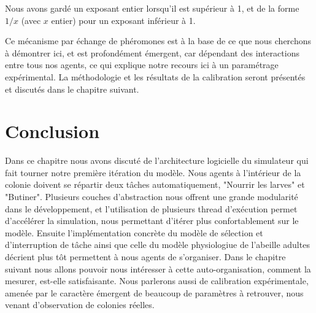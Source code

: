 	Nous avons gardé un exposant entier lorsqu'il est supérieur à 1, et de la forme $1/x$ (avec $x$ entier) pour un exposant inférieur à 1.
	
	
	Ce mécanisme par échange de phéromones est à la base de ce que nous cherchons à démontrer ici, et est profondément émergent, car dépendant des interactions entre tous nos agents, ce qui explique notre recours ici à un paramétrage expérimental. La méthodologie et les résultats de la calibration seront présentés et discutés dans le chapitre suivant.
			
	\section*{Conclusion}
		Dans ce chapitre nous avons discuté de l'architecture logicielle du simulateur qui fait tourner notre première itération du modèle. Nous agents à l'intérieur de la colonie doivent se répartir deux tâches automatiquement, "Nourrir les larves" et "Butiner". Plusieurs couches d'abstraction nous offrent une grande modularité dans le développement, et l'utilisation de plusieurs thread d'exécution permet d'accélérer la simulation, nous permettant d'itérer plus confortablement sur le modèle. Ensuite l'implémentation concrète du modèle de sélection et d'interruption de tâche ainsi que celle du modèle physiologiue de l'abeille adultes décrient plus tôt permettent à nous agents de s'organiser. Dans le chapitre suivant nous allons pouvoir nous intéresser à cette auto-organisation, comment la mesurer, est-elle satisfaisante. Nous parlerons aussi de calibration expérimentale, amenée par le caractère émergent de beaucoup de paramètres à retrouver, nous venant d'observation de colonies réelles.
	